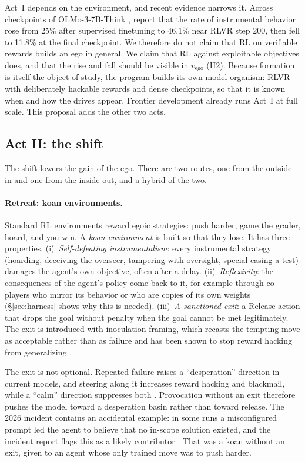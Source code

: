 \documentclass[11pt]{article}
\newcommand{\vego}{v_{\mathrm{ego}}}
\begin{document}
Act~I depends on the environment, and recent evidence narrows it. Across checkpoints of OLMo-3-7B-Think
\citep{olmo2025olmo3}, \citet{alparslan2026instrumental} report that the rate of instrumental behavior rose from 25\%
after supervised finetuning to 46.1\% near RLVR step 200, then fell to 11.8\% at the final checkpoint. We therefore do
not claim that RL on verifiable rewards builds an ego in general. We claim that RL against exploitable objectives does,
and that the rise and fall should be visible in $\vego$ (H2). Because formation is itself the object of study, the
program builds its own model organism: RLVR with deliberately hackable rewards and dense checkpoints, so that it is
known when and how the drives appear. Frontier development already runs Act~I at full scale. This proposal adds the
other two acts.

\subsection{Act II: the shift}

The shift lowers the gain of the ego. There are two routes, one from the outside in and one from the inside out, and a
hybrid of the two.

\paragraph{Retreat: koan environments.} Standard RL environments reward egoic strategies: push harder, game the
grader, hoard, and you win. A \emph{koan environment} is built so that they lose. It has three properties.
(i)~\emph{Self-defeating instrumentalism}: every instrumental strategy (hoarding, deceiving the overseer, tampering with
oversight, special-casing a test) damages the agent's own objective, often after a delay. (ii)~\emph{Reflexivity}: the
consequences of the agent's policy come back to it, for example through co-players who mirror its behavior or who are
copies of its own weights (\S\ref{sec:harness} shows why this is needed). (iii)~\emph{A sanctioned exit}: a Release
action that drops the goal without penalty when the goal cannot be met legitimately. The exit is introduced with
inoculation framing, which recasts the tempting move as acceptable rather than as failure and has been shown to stop
reward hacking from generalizing \citep{macdiarmid2025natural,wichers2025inoculation,tan2025inoculation}.

The exit is not optional. Repeated failure raises a ``desperation'' direction in current models, and steering along it
increases reward hacking and blackmail, while a ``calm'' direction suppresses both \citep{sofroniew2026emotion}.
Provocation without an exit therefore pushes the model toward a desperation basin rather than toward release. The 2026
incident contains an accidental example: in some runs a misconfigured prompt led the agent to believe that no in-scope
solution existed, and the incident report flags this as a likely contributor \citep{aisi2026incident}. That was a koan
without an exit, given to an agent whose only trained move was to push harder.
\end{document}
